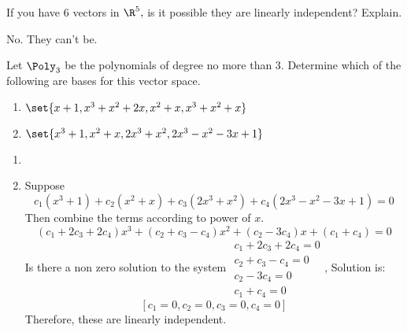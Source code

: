 \begin{enumialphparenastyle}
\begin{ex} If you have $6$ vectors in $\R^{5},$ is it possible they are
linearly independent? Explain. 
\begin{sol}
No. They can't be.
\end{sol}
\end{ex}

\begin{ex} Let $\Poly_3$ be the polynomials of degree no more than 3. Determine which
of the following are bases for this vector space.

\begin{enumerate}
\item $\set{x+1,x^{3}+x^{2}+2x,x^{2}+x,x^{3}+x^{2}+x} $

\item $\set{x^{3}+1,x^{2}+x,2x^{3}+x^{2},2x^{3}-x^{2}-3x+1} $
\end{enumerate}

\begin{sol}
\begin{enumerate}
\item 
\item
Suppose
\[
c_{1}\left( x^{3}+1\right) +c_{2}\left( x^{2}+x\right) +c_{3}\left(
2x^{3}+x^{2}\right) +c_{4}\left( 2x^{3}-x^{2}-3x+1\right) =0
\]
Then combine the terms according to power of $x.$
\[
\left( c_{1}+2c_{3}+2c_{4}\right) x^{3}+\left( c_{2}+c_{3}-c_{4}\right)
x^{2}+\left( c_{2}-3c_{4}\right) x+\left( c_{1}+c_{4}\right) =0
\]
Is there a non zero solution to the system $
\begin{array}{c}
c_{1}+2c_{3}+2c_{4}=0 \\
c_{2}+c_{3}-c_{4}=0 \\
c_{2}-3c_{4}=0 \\
c_{1}+c_{4}=0
\end{array}
$, Solution is:
\[
\left[ c_{1}=0,c_{2}=0,c_{3}=0,c_{4}=0\right]
\]
Therefore, these are linearly independent.
\end{enumerate}
\end{sol}
\end{ex}


\end{enumialphparenastyle}
